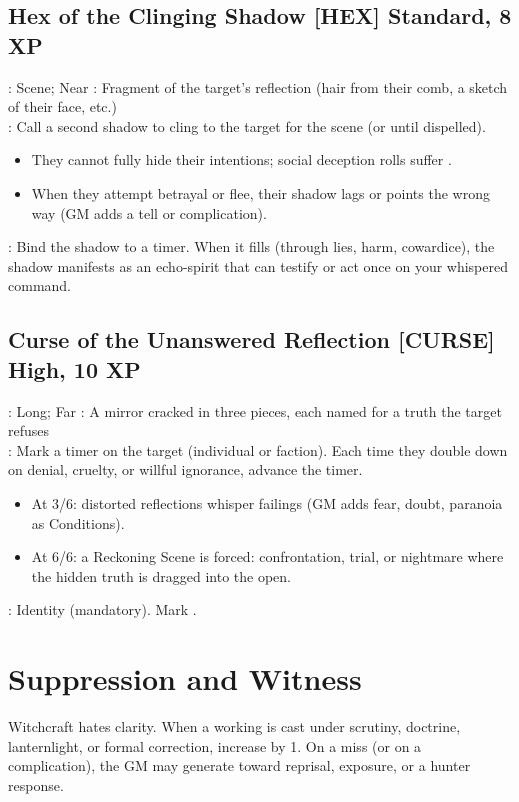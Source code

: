\subsection{Hex of the Clinging Shadow \hfill \textnormal{[HEX] Standard, 8 XP}}
\begin{RiteBox}
: Scene; Near \quad
{}: Fragment of the target's reflection (hair from their comb, a sketch of their face, etc.) \\
: Call a second shadow to cling to the target for the scene (or until dispelled).
\begin{itemize}
  \item They cannot fully hide their intentions; social deception rolls suffer .
  \item When they attempt betrayal or flee, their shadow lags or points the wrong way (GM adds a tell or complication).
\end{itemize}
: Bind the shadow to a  timer. When it fills (through lies, harm, cowardice), the shadow manifests as an echo-spirit that can testify or act once on your whispered command.
\end{RiteBox}

\subsection{Curse of the Unanswered Reflection \hfill \textnormal{[CURSE] High, 10 XP}}
\begin{RiteBox}
: Long; Far \quad
{}: A mirror cracked in three pieces, each named for a truth the target refuses \\
: Mark a  timer on the target (individual or faction). Each time they double down on denial, cruelty, or willful ignorance, advance the timer.
\begin{itemize}
  \item At 3/6: distorted reflections whisper failings (GM adds fear, doubt, paranoia as Conditions).
  \item At 6/6: a Reckoning Scene is forced: confrontation, trial, or nightmare where the hidden truth is dragged into the open.
\end{itemize}
: Identity (mandatory). Mark .
\end{RiteBox}

\section{Suppression and Witness}
Witchcraft hates clarity. When a working is cast under scrutiny, doctrine, lanternlight, or formal correction, increase \DV{} by 1. On a miss (or on a complication), the GM may generate \SB{} toward reprisal, exposure, or a hunter response.


